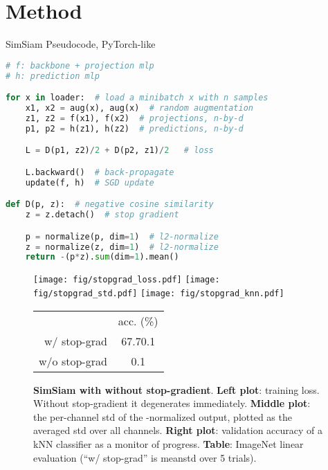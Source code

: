 \documentclass[final]{cvpr}
\newcommand{\tablestyle}[2]{\setlength{\tabcolsep}{#1}\renewcommand{\arraystretch}{#2}\centering\footnotesize}
\begin{document}
\section{Method\label{sec:method}}

\begin{algorithm}[t]
\caption{SimSiam Pseudocode, PyTorch-like}
\label{alg:code}
\begin{lstlisting}[language=python]
# f: backbone + projection mlp
# h: prediction mlp

for x in loader:  # load a minibatch x with n samples
    x1, x2 = aug(x), aug(x)  # random augmentation
    z1, z2 = f(x1), f(x2)  # projections, n-by-d
    p1, p2 = h(z1), h(z2)  # predictions, n-by-d

    L = D(p1, z2)/2 + D(p2, z1)/2   # loss

    L.backward()  # back-propagate
    update(f, h)  # SGD update

def D(p, z):  # negative cosine similarity
    z = z.detach()  # stop gradient

    p = normalize(p, dim=1)  # l2-normalize
    z = normalize(z, dim=1)  # l2-normalize
    return -(p*z).sum(dim=1).mean()
\end{lstlisting}
\end{algorithm}


\begin{figure*}[t]
\vspace{-.5em}
\begin{minipage}[c]{0.8\linewidth}
\texttt{[image: fig/stopgrad\_loss.pdf]}
\texttt{[image: fig/stopgrad\_std.pdf]}
\texttt{[image: fig/stopgrad\_knn.pdf]}
\end{minipage}
\begin{minipage}[c]{0.19\linewidth}
\small
\tablestyle{4pt}{1.2}
\begin{tabular}{r|c}
 & acc. (\%) \\
\shline
w/ stop-grad & 67.70.1 \\
w/o stop-grad & 0.1 \\
\end{tabular}
\vspace{-.5em}
\end{minipage}
\vspace{.8em}
\caption{\textbf{SimSiam with \vs without stop-gradient}.
\textbf{Left plot}: training loss. Without stop-gradient it degenerates immediately. 
\textbf{Middle plot}: the per-channel std of the -normalized output, plotted as the averaged std over all channels.
\textbf{Right plot}: validation accuracy of a kNN classifier \cite{Wu2018a} as a monitor of progress.
\textbf{Table}: ImageNet linear evaluation (``w/ stop-grad'' is meanstd over 5 trials).
\label{fig:stopgrad}
}
\vspace{-.5em}
\end{figure*}
\end{document}
